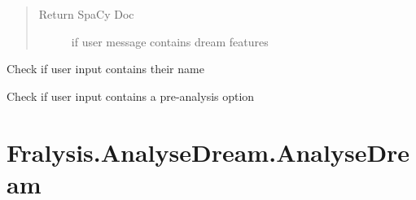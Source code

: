 \documentclass[letterpaper,10pt,english]{sphinxmanual}
\begin{document}
\begin{fulllineitems}
\begin{fulllineitems}
\begin{quote}
\begin{description}
\item[{Return SpaCy Doc}] \leavevmode
if user message contains dream features

\end{description}\end{quote}

\end{fulllineitems}


\begin{fulllineitems}
\label{\detokenize{index:Fralysis.MessageTypeAnalysis.MessageTypeAnalysis.is_name}}
Check if user input contains their name

\end{fulllineitems}


\begin{fulllineitems}
\label{\detokenize{index:Fralysis.MessageTypeAnalysis.MessageTypeAnalysis.is_option}}
Check if user input contains a pre-analysis option

\end{fulllineitems}


\end{fulllineitems}



\chapter{Fralysis.AnalyseDream.AnalyseDream}
\label{\detokenize{index:fralysis-analysedream-analysedream}}
\end{document}
